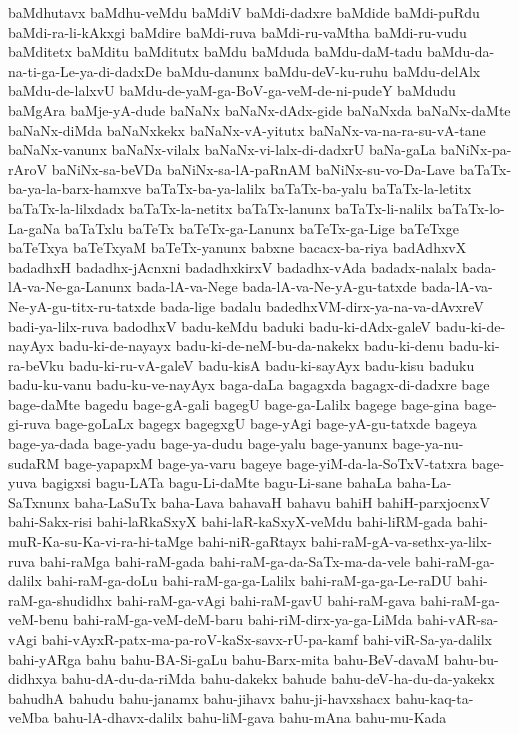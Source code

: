 {baMdhutavx
baMdhu-veMdu
baMdiV
baMdi-dadxre
baMdide
baMdi-puRdu
baMdi-ra-li-kAkxgi
baMdire
baMdi-ruva
baMdi-ru-vaMtha
baMdi-ru-vudu
baMditetx
baMditu
baMditutx
baMdu
baMduda
baMdu-daM-tadu
baMdu-da-na-ti-ga-Le-ya-di-dadxDe
baMdu-danunx
baMdu-deV-ku-ruhu
baMdu-delAlx
baMdu-de-lalxvU
baMdu-de-yaM-ga-BoV-ga-veM-de-ni-pudeY
baMdudu
baMgAra
baMje-yA-dude
baNaNx
baNaNx-dAdx-gide
baNaNxda
baNaNx-daMte
baNaNx-diMda
baNaNxkekx
baNaNx-vA-yitutx
baNaNx-va-na-ra-su-vA-tane
baNaNx-vanunx
baNaNx-vilalx
baNaNx-vi-lalx-di-dadxrU
baNa-gaLa
baNiNx-pa-rAroV
baNiNx-sa-beVDa
baNiNx-sa-lA-paRnAM
baNiNx-su-vo-Da-Lave
baTaTx-ba-ya-la-barx-hamxve
baTaTx-ba-ya-lalilx
baTaTx-ba-yalu
baTaTx-la-letitx
baTaTx-la-lilxdadx
baTaTx-la-netitx
baTaTx-lanunx
baTaTx-li-nalilx
baTaTx-lo-La-gaNa
baTaTxlu
baTeTx
baTeTx-ga-Lanunx
baTeTx-ga-Lige
baTeTxge
baTeTxya
baTeTxyaM
baTeTx-yanunx
babxne
bacacx-ba-riya
badAdhxvX
badadhxH
badadhx-jAcnxni
badadhxkirxV
badadhx-vAda
badadx-nalalx
bada-lA-va-Ne-ga-Lanunx
bada-lA-va-Nege
bada-lA-va-Ne-yA-gu-tatxde
bada-lA-va-Ne-yA-gu-titx-ru-tatxde
bada-lige
badalu
badedhxVM-dirx-ya-na-va-dAvxreV
badi-ya-lilx-ruva
badodhxV
badu-keMdu
baduki
badu-ki-dAdx-galeV
badu-ki-de-nayAyx
badu-ki-de-nayayx
badu-ki-de-neM-bu-da-nakekx
badu-ki-denu
badu-ki-ra-beVku
badu-ki-ru-vA-galeV
badu-kisA
badu-ki-sayAyx
badu-kisu
baduku
badu-ku-vanu
badu-ku-ve-nayAyx
baga-daLa
bagagxda
bagagx-di-dadxre
bage
bage-daMte
bagedu
bage-gA-gali
bagegU
bage-ga-Lalilx
bagege
bage-gina
bage-gi-ruva
bage-goLaLx
bagegx
bagegxgU
bage-yAgi
bage-yA-gu-tatxde
bageya
bage-ya-dada
bage-yadu
bage-ya-dudu
bage-yalu
bage-yanunx
bage-ya-nu-sudaRM
bage-yapapxM
bage-ya-varu
bageye
bage-yiM-da-la-SoTxV-tatxra
bage-yuva
bagigxsi
bagu-LATa
bagu-Li-daMte
bagu-Li-sane
bahaLa
baha-La-SaTxnunx
baha-LaSuTx
baha-Lava
bahavaH
bahavu
bahiH
bahiH-parxjocnxV
bahi-Sakx-risi
bahi-laRkaSxyX
bahi-laR-kaSxyX-veMdu
bahi-liRM-gada
bahi-muR-Ka-su-Ka-vi-ra-hi-taMge
bahi-niR-gaRtayx
bahi-raM-gA-va-sethx-ya-lilx-ruva
bahi-raMga
bahi-raM-gada
bahi-raM-ga-da-SaTx-ma-da-vele
bahi-raM-ga-dalilx
bahi-raM-ga-doLu
bahi-raM-ga-ga-Lalilx
bahi-raM-ga-ga-Le-raDU
bahi-raM-ga-shudidhx
bahi-raM-ga-vAgi
bahi-raM-gavU
bahi-raM-gava
bahi-raM-ga-veM-benu
bahi-raM-ga-veM-deM-baru
bahi-riM-dirx-ya-ga-LiMda
bahi-vAR-sa-vAgi
bahi-vAyxR-patx-ma-pa-roV-kaSx-savx-rU-pa-kamf
bahi-viR-Sa-ya-dalilx
bahi-yARga
bahu
bahu-BA-Si-gaLu
bahu-Barx-mita
bahu-BeV-davaM
bahu-bu-didhxya
bahu-dA-du-da-riMda
bahu-dakekx
bahude
bahu-deV-ha-du-da-yakekx
bahudhA
bahudu
bahu-janamx
bahu-jihavx
bahu-ji-havxshacx
bahu-kaq-ta-veMba
bahu-lA-dhavx-dalilx
bahu-liM-gava
bahu-mAna
bahu-mu-Kada
}
